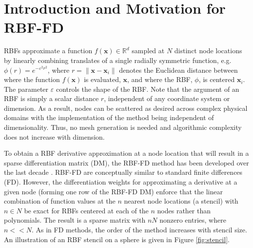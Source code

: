 

%


\section{Introduction and Motivation for RBF-FD}
\label{sec:rbf}

RBFs approximate a function $f(\mathbf{x}) \in \mathbb{R}^d$ sampled at $N$ distinct node locations by linearly combining translates of a single radially symmetric function, e.g. $\phi(r) = e^{-\varepsilon^2r^2}$, where $r=\|\mathbf{x}-\mathbf{x}_{i}\|$ denotes the Euclidean distance between where the function $f(\mathbf{x})$ is evaluated, $\mathbf{x}$, and where the RBF, $\phi$, is centered $\mathbf{x}_{i}$. The parameter $\varepsilon$ controls the shape of the RBF. Note that the argument of an RBF is simply a scalar distance $r$, independent of any coordinate system or dimension. As a result, nodes can be scattered as desired across complex physical domains with the implementation of the method being independent of dimensionality. Thus, no mesh generation is needed and algorithmic complexity does not increase with dimension.

To obtain a RBF derivative approximation at a node location that will result in a sparse differentiation matrix (DM), the RBF-FD method has been developed over the last decade \cite{TAI1,TAI2,SDY02,WrFo06}. RBF-FD are conceptually similar to standard finite differences (FD). However, the differentiation weights for approximating a derivative at a given node (forming one row of the RBF-FD DM) enforce that the linear combination of function values at the $n$ nearest node locations (a stencil) with $n \in N$ be exact for RBFs centered at each of the $n$ nodes rather than polynomials. The result is a sparse matrix with $nN$ nonzero entries, where $n<<N$. As in FD methods, the order of the method increases with stencil size. An illustration of an RBF stencil on a sphere is given in Figure \ref{fig:stencil}.

